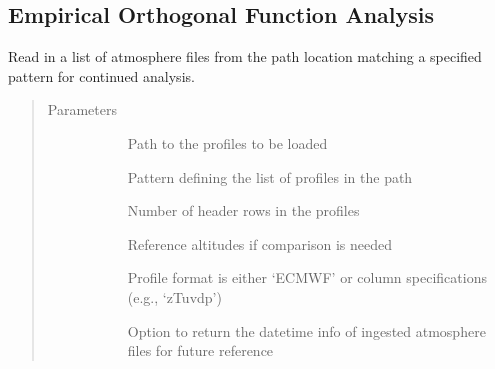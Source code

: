\documentclass[letterpaper,10pt,english]{sphinxmanual}
\begin{document}
\subsection{Empirical Orthogonal Function Analysis}
\label{\detokenize{stochprop.eofs:module-stochprop.eofs}}\label{\detokenize{stochprop.eofs:empirical-orthogonal-function-analysis}}\label{\detokenize{stochprop.eofs::doc}}

\begin{fulllineitems}
\label{\detokenize{stochprop.eofs:stochprop.eofs.build_atmo_matrix}}
Read in a list of atmosphere files from the path location
matching a specified pattern for continued analysis.
\begin{quote}\begin{description}
\item[{Parameters}] \leavevmode\begin{description}
\item[{}] \leavevmode
Path to the profiles to be loaded

\item[{}] \leavevmode
Pattern defining the list of profiles in the path

\item[{}] \leavevmode
Number of header rows in the profiles

\item[{}] \leavevmode
Reference altitudes if comparison is needed

\item[{}] \leavevmode
Profile format is either ‘ECMWF’ or column specifications (e.g., ‘zTuvdp’)

\item[{}] \leavevmode
Option to return the datetime info of ingested atmosphere files for future reference

\end{description}


\end{description}
\end{quote}
\end{fulllineitems}
\end{document}

